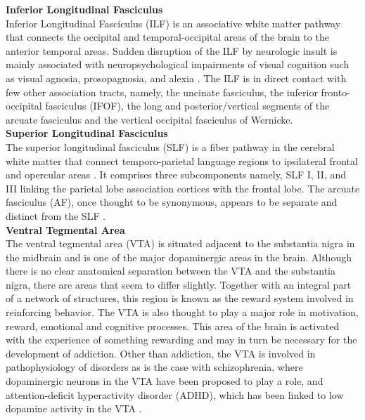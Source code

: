 \documentclass[../structure.tex]{subfiles}
\begin{document}
				
		\textbf{Inferior Longitudinal Fasciculus}\\		
		Inferior Longitudinal Fasciculus (ILF) is an associative white matter pathway that connects the occipital and temporal-occipital areas of the brain to the anterior temporal areas.  Sudden disruption of the ILF by neurologic insult is mainly associated with  neuropsychological impairments of visual cognition such as visual agnosia, prosopagnosia, and alexia \cite{Herbet2018}. The ILF is in direct contact with few other association tracts, namely, the uncinate fasciculus, the inferior fronto-occipital fasciculus (IFOF), the long and posterior/vertical segments of the arcuate fasciculus and the vertical occipital fasciculus of Wernicke.\\

		

		\textbf{Superior Longitudinal Fasciculus}\\			
		The superior longitudinal fasciculus (SLF) is a fiber pathway in the cerebral white matter that connect temporo-parietal language regions to ipsilateral frontal and opercular areas \cite{Madhavan2014}. It comprises three subcomponents namely, SLF I, II, and III linking the parietal lobe association cortices with the frontal lobe. The arcuate fasciculus (AF), once thought to be synonymous, appears to be separate and distinct from the SLF \cite{Schmahmann2006}.\\
		
		
		\textbf{Ventral Tegmental Area}\\
		The ventral tegmental area (VTA) is situated adjacent to the substantia nigra in the midbrain and is one of the major dopaminergic areas in the brain. Although there is no clear anatomical separation between the VTA and the substantia nigra, there are areas that seem to differ slightly. Together with an integral part of a network of structures, this region is known as the reward system involved in reinforcing behavior. The VTA is also thought to play a major role in motivation, reward, emotional and cognitive processes. This area of the brain is activated with the experience of something rewarding and may in turn be necessary for the development of addiction. Other than addiction, the VTA is involved in pathophysiology of disorders as is the case with schizophrenia, where dopaminergic neurons in the VTA have been proposed to play a role, and attention-deficit hyperactivity disorder (ADHD), which has been linked to low dopamine activity in the VTA \cite{Kalivas1993}.\\
	
\end{document}
